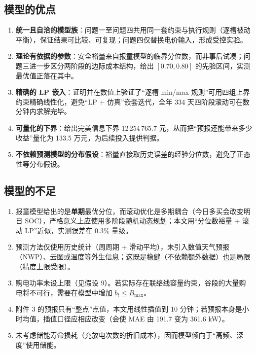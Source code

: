 \documentclass{cumcmthesis}
\begin{document}
\subsection{模型的优点}
\begin{enumerate}
    \item \textbf{统一且自洽的模型族}：问题一至问题四共用同一套约束与执行规则（逐槽被动平衡），保证结果可比较、可复现；问题四仅替换电价输入，形成受控实验。
    \item \textbf{理论有依据的参数}：安全裕量来自报童模型的临界分位数，而非事后试凑；问题三进一步区分两阶段的边际成本结构，给出 $[0.70,0.80]$ 的先验区间，实测最优值正落在其中。
    \item \textbf{精确的 LP 嵌入}：证明并在数值上验证了“逐槽 min/max 规则”可用四组上界约束精确线性化，避免“LP + 仿真”嵌套迭代，全年 334 天四阶段滚动可在数分钟内求解完毕。
    \item \textbf{可量化的下界}：给出完美信息下界 12\,254\,765.7 元，从而把“预报还能带来多少收益”量化为 133.5 万元，为后续投入提供判据。
    \item \textbf{不依赖预测模型的分布假设}：裕量直接取历史误差的经验分位数，避免了正态性等分布假设。
\end{enumerate}

\subsection{模型的不足}
\begin{enumerate}
    \item 报童模型给出的是\textbf{单期}最优分位，而滚动优化是多期耦合（今日多买会改变明日 SOC），严格意义上应使用多阶段随机动态规划；本文用“分位数裕量 + 滚动 LP”近似，实测误差在 0.3\% 量级。
    \item 预测方法仅使用历史统计（周周期 + 滑动平均），未引入数值天气预报（NWP）、云图或温度等外生信息；这既是稳健（不依赖额外数据）也是局限（精度上限受限）。
    \item 购电功率未设上限（见假设 9）。若实际存在联络线容量约束，谷段的大量购电将不可行，需要在模型中增加 $b_t\le B_{\max}$。
    \item 附件 3 的预报只有“整点”点值，本文用线性插值到 10 分钟；若预报本身是小时均值，插值口径应相应改变（会使 MAE 由 191.7 变为 361.6 kW）。
    \item 未考虑储能寿命损耗（充放电次数的折旧成本），因而模型倾向于“高频、深度”使用储能。
\end{enumerate}
\end{document}
